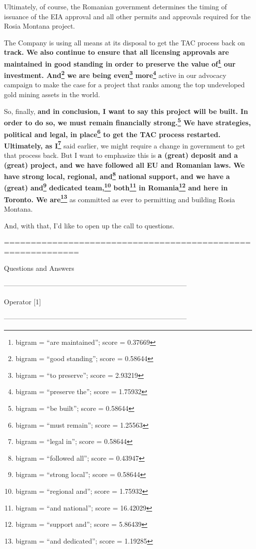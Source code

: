 \documentclass{article}
\begin{document}
 Ultimately, of course, the Romanian government determines the timing of issuance of the EIA approval and all other permits and approvals required for the Rosia Montana project. 

 The Company is using all means at its disposal to get the TAC process back on \textbf{track. We also continue to ensure that all licensing approvals are maintained in good standing in order to preserve the value of\footnote{bigram = ``are maintained''; score = 0.37669} our investment. And\footnote{bigram = ``good standing''; score = 0.58644} we are being even\footnote{bigram = ``to preserve''; score = 2.93219} more\footnote{bigram = ``preserve the''; score = 1.75932}} active in our advocacy campaign to make the case for a project that ranks among the top undeveloped gold mining assets in the world. 

 So, finally, \textbf{and in conclusion, I want to say this project will be built. In order to do so, we must remain financially strong.\footnote{bigram = ``be built''; score = 0.58644} We have strategies, political and legal, in place\footnote{bigram = ``must remain''; score = 1.25563} to get the TAC process restarted. Ultimately, as I\footnote{bigram = ``legal in''; score = 0.58644}} said earlier, we might require a change in government to get that process back. But I want to emphasize this is \textbf{a (great) deposit and a (great) project, and we have followed all EU and Romanian laws. We have strong local, regional, and\footnote{bigram = ``followed all''; score = 0.43947} national support, and we have a (great) and\footnote{bigram = ``strong local''; score = 0.58644} dedicated team,\footnote{bigram = ``regional and''; score = 1.75932} both\footnote{bigram = ``and national''; score = 16.42029} in Romania\footnote{bigram = ``support and''; score = 5.86439} and here in Toronto. We are\footnote{bigram = ``and dedicated''; score = 1.19285}} as committed as ever to permitting and building Rosia Montana. 

 And, with that, I'd like to open up the call to questions. 

 

 ============================================================ 

 Questions and Answers 

 -------------------------------------------------------------------------------- 

 Operator [1] 

 -------------------------------------------------------------------------------- 
\end{document}
